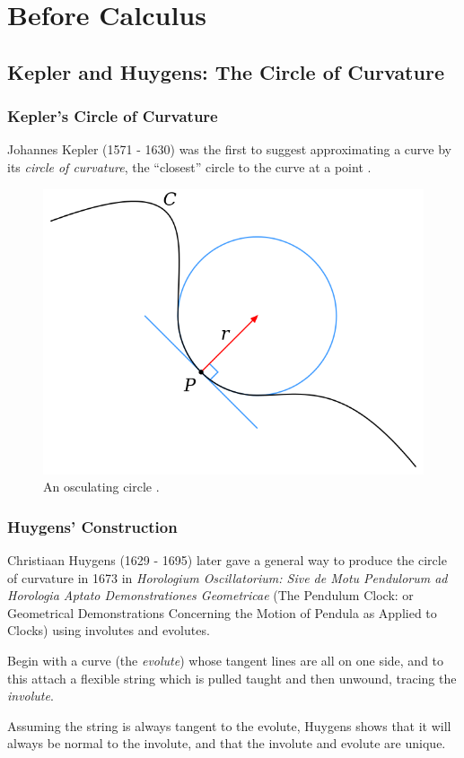 \documentclass[handout]{beamer}
\theoremstyle{definition}
\begin{document}
\section{Before Calculus}

\subsection{Kepler and Huygens: The Circle of Curvature}

\begin{frame}
    \frametitle{Kepler's Circle of Curvature}

    \pause
    Johannes Kepler (1571 - 1630) was the first to suggest approximating a curve by
    its \emph{circle of curvature}, the ``closest'' circle to the curve at a point
    \cite{unsat-hist}.

    \pause
    \begin{figure}
        \centering
        \includegraphics[width=.5\textwidth]{images/Osculating_circle.svg.png}
        \caption{An osculating circle \cite{intern-et-al}.}
    \end{figure}
\end{frame}

\begin{frame}
    \frametitle{Huygens' Construction}

    \pause
    Christiaan Huygens (1629 - 1695) later gave a general way to produce the
    circle of curvature in 1673 in \textit{Horologium Oscillatorium: Sive de Motu Pendulorum
    ad Horologia Aptato Demonstrationes Geometricae}
    (The Pendulum Clock: or Geometrical Demonstrations Concerning the Motion of Pendula as
    Applied to Clocks) using involutes and evolutes.

    \pause
    Begin with a curve (the \emph{evolute}) whose tangent lines are all on one side,
    and to this attach a flexible string which is pulled taught and then unwound,
    tracing the \emph{involute}.

    Assuming the string is always tangent to the evolute, Huygens shows that it will
    always be normal to the involute, and that the involute and evolute are unique.

\end{frame}
\end{document}
